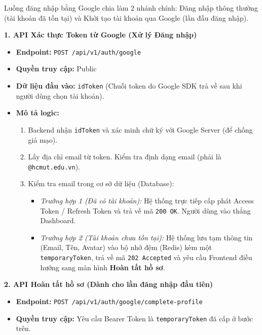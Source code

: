 Luồng đăng nhập bằng Google chia làm 2 nhánh chính: Đăng nhập thông thường (tài khoản đã tồn tại) và Khởi tạo tài khoản qua Google (lần đầu đăng nhập).

\vspace{0.3cm}
\noindent\textbf{1. API Xác thực Token từ Google (Xử lý Đăng nhập)}
\begin{itemize}
    \item \textbf{Endpoint:} \texttt{POST /api/v1/auth/google}
    \item \textbf{Quyền truy cập:} Public
    \item \textbf{Dữ liệu đầu vào:} \texttt{idToken} (Chuỗi token do Google SDK trả về sau khi người dùng chọn tài khoản).
    \item \textbf{Mô tả logic:}
    \begin{enumerate}
        \item Backend nhận \texttt{idToken} và xác minh chữ ký với Google Server (để chống giả mạo).
        \item Lấy địa chỉ email từ token. Kiểm tra định dạng email (phải là \texttt{@hcmut.edu.vn}).
        \item Kiểm tra email trong cơ sở dữ liệu (Database):
        \begin{itemize}
            \item \textit{Trường hợp 1 (Đã có tài khoản):} Hệ thống trực tiếp cấp phát Access Token / Refresh Token và trả về mã \texttt{200 OK}. Người dùng vào thẳng Dashboard.
            \item \textit{Trường hợp 2 (Tài khoản chưa tồn tại):} Hệ thống lưu tạm thông tin (Email, Tên, Avatar) vào bộ nhớ đệm (Redis) kèm một \texttt{temporaryToken}, trả về mã \texttt{202 Accepted} và yêu cầu Frontend điều hướng sang màn hình \textbf{Hoàn tất hồ sơ}.
        \end{itemize}
    \end{enumerate}
\end{itemize}

\vspace{0.3cm}
\noindent\textbf{2. API Hoàn tất hồ sơ (Dành cho lần đăng nhập đầu tiên)}
\begin{itemize}
    \item \textbf{Endpoint:} \texttt{POST /api/v1/auth/google/complete-profile}
    \item \textbf{Quyền truy cập:} Yêu cầu Bearer Token là \texttt{temporaryToken} đã cấp ở bước trên.
\end{itemize}

